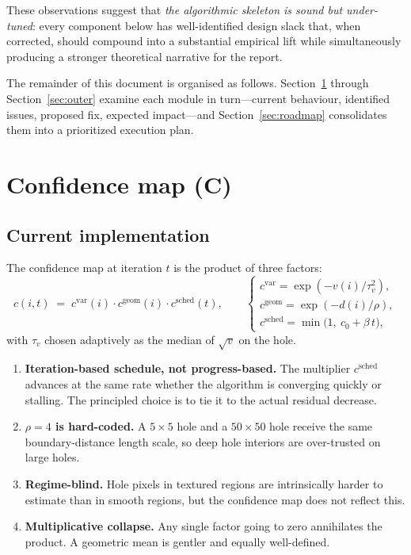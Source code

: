 \documentclass[11pt,a4paper]{article}
\begin{document}
These observations suggest that \emph{the algorithmic skeleton is sound but
under-tuned}: every component below has well-identified design slack that,
when corrected, should compound into a substantial empirical lift while
simultaneously producing a stronger theoretical narrative for the report.

The remainder of this document is organised as follows. Section~\ref{sec:C}
through Section~\ref{sec:outer} examine each module in turn---current
behaviour, identified issues, proposed fix, expected impact---and
Section~\ref{sec:roadmap} consolidates them into a prioritized execution
plan.

\section{Confidence map (C)}\label{sec:C}

\subsection*{Current implementation}

The confidence map at iteration $t$ is the product of three factors:
\begin{equation}
    c(i, t) \;=\; c^{\mathrm{var}}(i)\cdot c^{\mathrm{geom}}(i)\cdot c^{\mathrm{sched}}(t),
    \qquad
    \begin{cases}
        c^{\mathrm{var}}  = \exp\!\left(-v(i)/\tau_v^2\right), \\[2pt]
        c^{\mathrm{geom}} = \exp\!\left(-d(i)/\rho\right), \\[2pt]
        c^{\mathrm{sched}}= \min\!\big(1,\ c_0 + \beta\, t\big),
    \end{cases}
\end{equation}
with $\tau_v$ chosen adaptively as the median of $\sqrt{v}$ on the hole.

\begin{issuebox}
\begin{enumerate}[leftmargin=1.2em,itemsep=2pt]
    \item \textbf{Iteration-based schedule, not progress-based.} The
    multiplier $c^{\mathrm{sched}}$ advances at the same rate whether the
    algorithm is converging quickly or stalling. The principled choice is
    to tie it to the actual residual decrease.
    \item \textbf{$\rho = 4$ is hard-coded.} A $5\times 5$ hole and a
    $50\times 50$ hole receive the same boundary-distance length scale, so
    deep hole interiors are over-trusted on large holes.
    \item \textbf{Regime-blind.} Hole pixels in textured regions are
    intrinsically harder to estimate than in smooth regions, but the
    confidence map does not reflect this.
    \item \textbf{Multiplicative collapse.} Any single factor going to zero
    annihilates the product. A geometric mean is gentler and equally
    well-defined.
\end{enumerate}
\end{issuebox}
\end{document}
